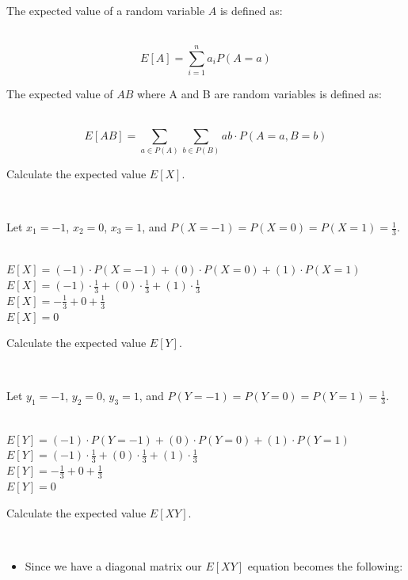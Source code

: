 \documentclass{article}
\begin{document}
\parbox{\textwidth}{The expected value of a random variable $A$ is defined as:}\\

$$E[A] = \sum^{n}_{i=1} a_i P(A=a)$$

\parbox{\textwidth}{The expected value of $AB$  where A and B are random variables is defined as:}\\

$$E[AB] = \sum_{a \in P(A)} \sum_{b \in P(B)} ab \cdot P(A = a, B = b)$$

\parbox{\textwidth}{Calculate the expected value $E[X]$.}\\

\parbox{\textwidth}{Let $x_1 = -1$, $x_2 = 0$, $x_3 = 1$, and $P(X=-1) = P(X=0) = P(X=1) = \frac{1}{3}$.}\\

$E[X] = (-1) \cdot P(X = -1) + (0) \cdot P(X = 0) + (1) \cdot P(X = 1)$\\

$E[X] = (-1) \cdot \frac{1}{3} + (0) \cdot \frac{1}{3} + (1) \cdot \frac{1}{3}$\\

$E[X] = -\frac{1}{3} + 0 + \frac{1}{3}$\\

$E[X] = 0$\\

\parbox{\textwidth}{Calculate the expected value $E[Y]$.}\\

\parbox{\textwidth}{Let $y_1 = -1$, $y_2 = 0$, $y_3 = 1$, and $P(Y=-1) = P(Y=0) = P(Y=1) = \frac{1}{3}$.}\\

$E[Y] = (-1) \cdot P(Y = -1) + (0) \cdot P(Y = 0) + (1) \cdot P(Y = 1)$\\

$E[Y] = (-1) \cdot \frac{1}{3} + (0) \cdot \frac{1}{3} + (1) \cdot \frac{1}{3}$\\

$E[Y] = -\frac{1}{3} + 0 + \frac{1}{3}$\\

$E[Y] = 0$\\

\parbox{\textwidth}{Calculate the expected value $E[XY]$.}\\

\begin{itemize}
    \item \parbox{\textwidth}{Since we have a diagonal matrix our $E[XY]$ equation becomes the following:}
\end{itemize}
\end{document}
